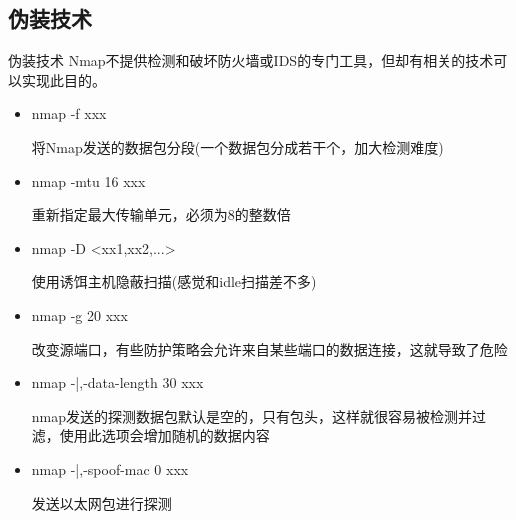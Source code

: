 \documentclass{beamer}
\begin{document}
\subsection{伪装技术}
\begin{frame}
\end{frame}
\begin{frame}{伪装技术}
Nmap不提供检测和破坏防火墙或IDS的专门工具，但却有相关的技术可以实现此目的。
\begin{itemize}
\item nmap -f xxx

将Nmap发送的数据包分段(一个数据包分成若干个，加大检测难度)
\item nmap -mtu 16 xxx

重新指定最大传输单元，必须为8的整数倍
\item nmap -D <xx1,xx2,...>

使用诱饵主机隐蔽扫描(感觉和idle扫描差不多)
\item nmap -g 20 xxx

改变源端口，有些防护策略会允许来自某些端口的数据连接，这就导致了危险
\item nmap -|,-data-length 30 xxx

nmap发送的探测数据包默认是空的，只有包头，这样就很容易被检测并过滤，使用此选项会增加随机的数据内容
\item nmap -|,-spoof-mac 0 xxx

发送以太网包进行探测

\end{itemize}
\end{frame}
\end{document}
